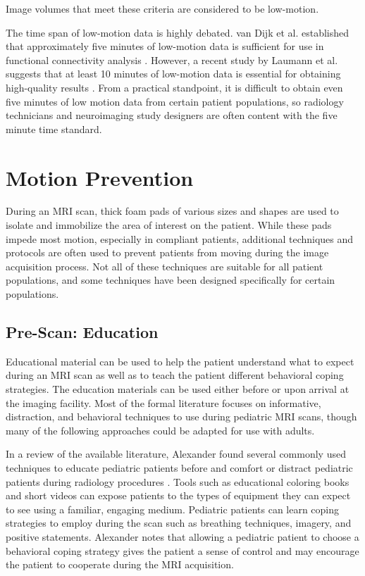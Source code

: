 \noindent Image volumes that meet these criteria are considered to be low-motion.

The time span of low-motion data is highly debated. van Dijk et al. established that approximately five minutes of low-motion data is sufficient for use in functional connectivity analysis \cite{VanDijk2012}. However, a recent study by Laumann et al. suggests that at least 10 minutes of low-motion data is essential for obtaining high-quality results \cite{Laumann2015}. From a practical standpoint, it is difficult to obtain even five minutes of low motion data from certain patient populations, so radiology technicians and neuroimaging study designers are often content with the five minute time standard. 

\section{Motion Prevention}

During an MRI scan, thick foam pads of various sizes and shapes are used to isolate and immobilize the area of interest on the patient. While these pads impede most motion, especially in compliant patients, additional techniques and protocols are often used to prevent patients from moving during the image acquisition process. Not all of these techniques are suitable for all patient populations, and some techniques have been designed specifically for certain populations.

\subsection{Pre-Scan: Education}

Educational material can be used to help the patient understand what to expect during an MRI scan as well as to teach the patient different behavioral coping strategies. The education materials can be used either before or upon arrival at the imaging facility. Most of the formal literature focuses on informative, distraction, and behavioral techniques to use during pediatric MRI scans, though many of the following approaches could be adapted for use with adults.

In a review of the available literature, Alexander found several commonly used techniques to educate pediatric patients before and comfort or distract pediatric patients during radiology procedures \cite{Alexander2012}. Tools such as educational coloring books and short videos can expose patients to the types of equipment they can expect to see using a familiar, engaging medium. Pediatric patients can learn coping strategies to employ during the scan such as breathing techniques, imagery, and positive statements. Alexander notes that allowing a pediatric patient to choose a behavioral coping strategy gives the patient a sense of control and may encourage the patient to cooperate during the MRI acquisition.

